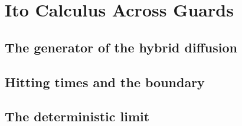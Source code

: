 
\section{Ito Calculus Across Guards}
\label{p3:apx:ito}

\subsection{The generator of the hybrid diffusion}
\label{p3:sub:apx_hybrid_generator}

\subsection{Hitting times and the boundary}
\label{p3:sub:apx_hitting_times}

\subsection{The deterministic limit}
\label{p3:sub:apx_deterministic_limit}
